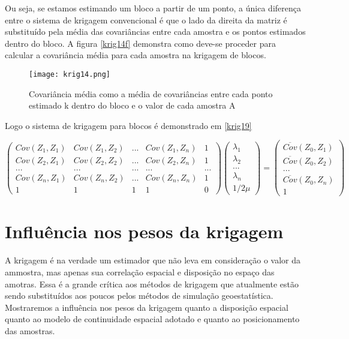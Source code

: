 Ou seja, se estamos estimando um bloco a partir de um ponto, a única diferença entre o sistema de krigagem convencional é que o lado da direita da matriz é substituído pela média das covariâncias entre cada amostra e os pontos estimados dentro do bloco. A figura \eqref{krig14f} demonstra como deve-se proceder para calcular a covariância média para cada amostra na krigagem de blocos.

\begin{figure}[H]
	\centering
	\texttt{[image: krig14.png]}
	\caption{Covariância média como a média de covariâncias entre cada ponto estimado k dentro do bloco e o valor de cada amostra A}
	\label{krig14f}
\end{figure}

Logo o sistema de krigagem para blocos é demonstrado em \eqref{krig19}

  \begin{equation}\label{krig19}
  \begin{pmatrix}
  Cov(Z_{1},Z_{1})&Cov(Z_{1},Z_{2})& ... & Cov(Z_{1},Z_{n})& 1\\ 
  Cov(Z_{2},Z_{1})&Cov(Z_{2},Z_{2})& ... & Cov(Z_{2},Z_{n})& 1 \\ 
  ...&...& ...&... & ...\\
  Cov(Z_{n},Z_{1})&Cov(Z_{n},Z_{2})& ... & Cov(Z_{n},Z_{n})& 1\\
  1&1& 1&1& 0
  \end{pmatrix} 
  \begin{pmatrix}
  \lambda _{1}\\ 
  \lambda _{2}\\ 
  ...\\ 
  \lambda _{n}\\
  1/2\mu
  \end{pmatrix}=\begin{pmatrix}
  \overline{Cov}(Z_{0}, Z_{1})\\ 
  \overline{Cov}(Z_{0}, Z_{2})\\  
  ...\\
  \overline{Cov}(Z_{0}, Z_{n})\\
  1
  \end{pmatrix}
  \end{equation}

\section{Influência nos pesos da krigagem}

A krigagem é na verdade um estimador que não leva em consideração o valor da ammostra, mas apenas sua correlação espacial e disposição no espaço das amotras. Essa é a grande crítica aos métodos de krigagem que atualmente estão sendo substituídos aos poucos pelos métodos de simulação geoestatística. Mostraremos a influência nos pesos da krigagem quanto a disposição espacial quanto ao modelo de continuidade espacial adotado e quanto ao posicionamento das amostras. 

